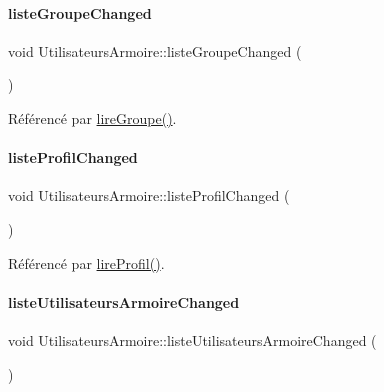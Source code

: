 \paragraph{\texorpdfstring{liste\+Groupe\+Changed}{listeGroupeChanged}}
{\footnotesize\ttfamily void Utilisateurs\+Armoire\+::liste\+Groupe\+Changed (\begin{DoxyParamCaption}{ }\end{DoxyParamCaption})\hspace{0.3cm}{\ttfamily [signal]}}



Référencé par \hyperlink{class_utilisateurs_armoire_aeadd41da356116c6e393d832e2b819e9}{lire\+Groupe()}.

\mbox{\label{class_utilisateurs_armoire_a8208260671720fdbd5d6f13b0e6827f2}} 
\paragraph{\texorpdfstring{liste\+Profil\+Changed}{listeProfilChanged}}
{\footnotesize\ttfamily void Utilisateurs\+Armoire\+::liste\+Profil\+Changed (\begin{DoxyParamCaption}{ }\end{DoxyParamCaption})\hspace{0.3cm}{\ttfamily [signal]}}



Référencé par \hyperlink{class_utilisateurs_armoire_a952931c38642273c5e959edb69706144}{lire\+Profil()}.

\mbox{\label{class_utilisateurs_armoire_ac65c676a1c55c1e04732647188c4ad5b}} 
\paragraph{\texorpdfstring{liste\+Utilisateurs\+Armoire\+Changed}{listeUtilisateursArmoireChanged}}
{\footnotesize\ttfamily void Utilisateurs\+Armoire\+::liste\+Utilisateurs\+Armoire\+Changed (\begin{DoxyParamCaption}{ }\end{DoxyParamCaption})\hspace{0.3cm}{\ttfamily [signal]}}



